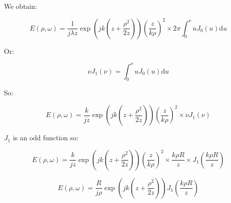 \documentclass[10pt,a4paper]{article}
\begin{document}
We obtain:

\[
E(\rho,\omega)=\frac{1}{j\lambda z} \exp\left(jk\left(z+\frac{\rho^2}{2z}\right)\right)
\left(\frac{z}{k\rho}\right)^2
\times 2\pi \int_0^\nu u J_0(u) \mathrm{d}u
\]

Or:

\[\nu J_1(\nu)=\int_0^\nu u J_0(u) \mathrm{d}u\]

So:

\[
E(\rho,\omega)=\frac{k}{jz} \exp\left(jk\left(z+\frac{\rho^2}{2z}\right)\right)
\left(\frac{z}{k\rho}\right)^2
\times \nu J_1(\nu)
\]

$J_1$ is an odd function so:

\[
E(\rho,\omega)=\frac{k}{jz} \exp\left(jk\left(z+\frac{\rho^2}{2z}\right)\right)
\left(\frac{z}{k\rho}\right)^2
\times \frac{k\rho R}{z} \times J_1\left(\frac{k\rho R}{z}\right)
\]

\[
E(\rho,\omega)=\frac{R}{j\rho} \exp\left(jk\left(z+\frac{\rho^2}{2z}\right)\right)
J_1\left(\frac{k\rho R}{z}\right)
\]
\end{document}

